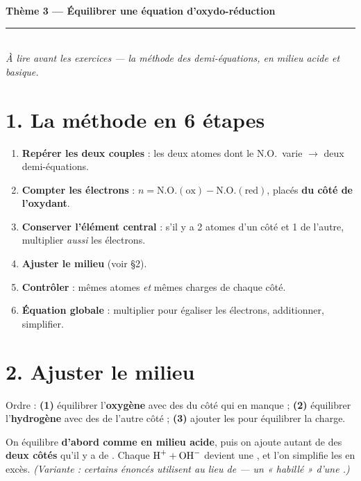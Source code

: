 \documentclass[11pt,a4paper]{article}
\newcommand{\NO}{\ensuremath{\mathrm{N.O.}}}
\begin{document}
\begin{center}
{\LARGE\bfseries\color{primarydark}Thème 3 — Équilibrer une équation d'oxydo-réduction}\\[3pt]
{\color{primary}\rule{9.5cm}{1.2pt}}\\[4pt]
{\small\itshape À lire avant les exercices — la méthode des demi-équations, en milieu acide et basique.}
\end{center}

\vspace{-2pt}
\section*{1. La méthode en 6 étapes}
\begin{methode}
\begin{enumerate}[label=\textbf{\arabic*.},leftmargin=2.2em,topsep=2pt,itemsep=1.5pt]
  \item \textbf{Repérer les deux couples} : les deux atomes dont le \NO\ varie $\to$ deux demi-équations.
  \item \textbf{Compter les électrons} : $n=\NO(\text{ox})-\NO(\text{red})$, placés \textbf{du côté de l'oxydant}.
  \item \textbf{Conserver l'élément central} : s'il y a 2 atomes d'un côté et 1 de l'autre, multiplier
        \emph{aussi} les électrons.
  \item \textbf{Ajuster le milieu} (voir §2).
  \item \textbf{Contrôler} : mêmes atomes \emph{et} mêmes charges de chaque côté.
  \item \textbf{Équation globale} : multiplier pour égaliser les électrons, additionner, simplifier.
\end{enumerate}
\end{methode}

\section*{2. Ajuster le milieu}
\begin{regle}
Ordre : \textbf{(1)} équilibrer l'\textbf{oxygène} avec des  du côté qui en manque ;
\textbf{(2)} équilibrer l'\textbf{hydrogène} avec des  de l'autre côté ;
\textbf{(3)} ajouter les  pour équilibrer la charge.
\end{regle}

\begin{regle}
On équilibre \textbf{d'abord comme en milieu acide}, puis on ajoute autant de  des
\textbf{deux côtés} qu'il y a de . Chaque $\ce{H+ + OH^-}$ devient une , et l'on
simplifie les  en excès. \emph{(Variante : certains énoncés utilisent  au lieu de
 — un  « habillé » d'une .)}
\end{regle}
\end{document}
